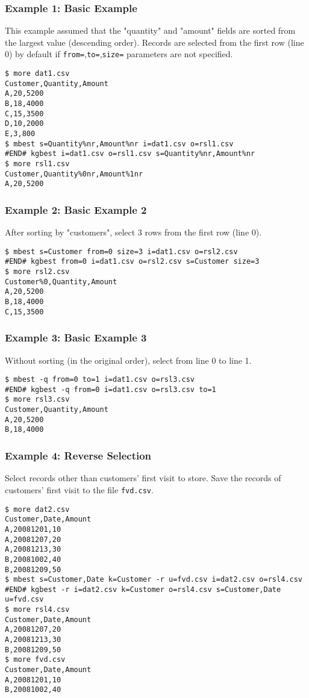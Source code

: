 \subsubsection*{Example 1: Basic Example}

This example assumed that the "quantity" and "amount" fields are sorted from the largest value (descending order).
Records are selected from the first row (line 0) by default if \verb|from=|,\verb|to=|,\verb|size=| parameters are not specified.


\begin{Verbatim}[baselinestretch=0.7,frame=single]
$ more dat1.csv
Customer,Quantity,Amount
A,20,5200 
B,18,4000   
C,15,3500 
D,10,2000 
E,3,800 
$ mbest s=Quantity%nr,Amount%nr i=dat1.csv o=rsl1.csv
#END# kgbest i=dat1.csv o=rsl1.csv s=Quantity%nr,Amount%nr
$ more rsl1.csv
Customer,Quantity%0nr,Amount%1nr
A,20,5200 
\end{Verbatim}
\subsubsection*{Example 2: Basic Example 2}

After sorting by "customers", select 3 rows from the first row (line 0).


\begin{Verbatim}[baselinestretch=0.7,frame=single]
$ mbest s=Customer from=0 size=3 i=dat1.csv o=rsl2.csv
#END# kgbest from=0 i=dat1.csv o=rsl2.csv s=Customer size=3
$ more rsl2.csv
Customer%0,Quantity,Amount
A,20,5200 
B,18,4000   
C,15,3500 
\end{Verbatim}
\subsubsection*{Example 3: Basic Example 3}

Without sorting (in the original order), select from line 0 to line 1.


\begin{Verbatim}[baselinestretch=0.7,frame=single]
$ mbest -q from=0 to=1 i=dat1.csv o=rsl3.csv
#END# kgbest -q from=0 i=dat1.csv o=rsl3.csv to=1
$ more rsl3.csv
Customer,Quantity,Amount
A,20,5200 
B,18,4000   
\end{Verbatim}
\subsubsection*{Example 4: Reverse Selection}

Select records other than customers' first visit to store.
Save the records of customers' first visit to the file \verb|fvd.csv|.


\begin{Verbatim}[baselinestretch=0.7,frame=single]
$ more dat2.csv
Customer,Date,Amount
A,20081201,10
A,20081207,20
A,20081213,30
B,20081002,40
B,20081209,50
$ mbest s=Customer,Date k=Customer -r u=fvd.csv i=dat2.csv o=rsl4.csv
#END# kgbest -r i=dat2.csv k=Customer o=rsl4.csv s=Customer,Date u=fvd.csv
$ more rsl4.csv
Customer,Date,Amount
A,20081207,20
A,20081213,30
B,20081209,50
$ more fvd.csv
Customer,Date,Amount
A,20081201,10
B,20081002,40
\end{Verbatim}
